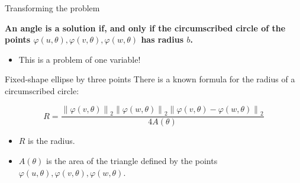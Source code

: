 \documentclass{beamer}
\newcommand{\norm}[2][2]{\left\lVert#2\right\rVert_{#1}}
\begin{document}
\begin{frame}{Transforming the problem}
	
	\textbf{An angle is a solution if, and only if the circumscribed circle of the points  $\varphi(u, \theta), \varphi(v, \theta), \varphi(w, \theta)$ has radius $b$.}
	
	\begin{itemize}
		\item This is a problem of one variable!
				
	\end{itemize}

\end{frame}

\begin{frame}{Fixed-shape ellipse by three points}
	There is a known formula for the radius of a circumscribed circle:

	\begin{equation*}
	R = \dfrac{\norm{\varphi(v, \theta)}\norm{\varphi(w, \theta)}\norm{\varphi(v, \theta)-\varphi(w, \theta)}   }{4A(\theta)}
	\end{equation*}
	
	\begin{itemize}
		\item $R$ is the radius.
		\item $A(\theta)$ is the area of the triangle defined by the points $\varphi(u, \theta), \varphi(v, \theta), \varphi(w, \theta)$.
	\end{itemize}
	\vspace{\baselineskip}
	

												
\end{frame}
\end{document}
